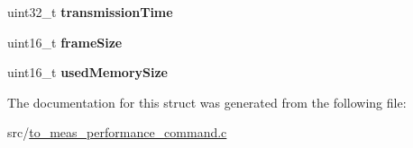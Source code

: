 \begin{DoxyCompactItemize}
\item 
uint32\+\_\+t {\bfseries transmission\+Time}\hypertarget{structtoken_af6f82a2bfaf32e4cf98da3f11fdcd0f0}{}\label{structtoken_af6f82a2bfaf32e4cf98da3f11fdcd0f0}

\item 
uint16\+\_\+t {\bfseries frame\+Size}\hypertarget{structtoken_adde682182f5f6682ca1ef4da990e5e02}{}\label{structtoken_adde682182f5f6682ca1ef4da990e5e02}

\item 
uint16\+\_\+t {\bfseries used\+Memory\+Size}\hypertarget{structtoken_a3bd4e46e9a81fcfcf21133dc1b572831}{}\label{structtoken_a3bd4e46e9a81fcfcf21133dc1b572831}

\end{DoxyCompactItemize}


The documentation for this struct was generated from the following file\+:\begin{DoxyCompactItemize}
\item 
src/\hyperlink{to__meas__performance__command_8c}{to\+\_\+meas\+\_\+performance\+\_\+command.\+c}\end{DoxyCompactItemize}
